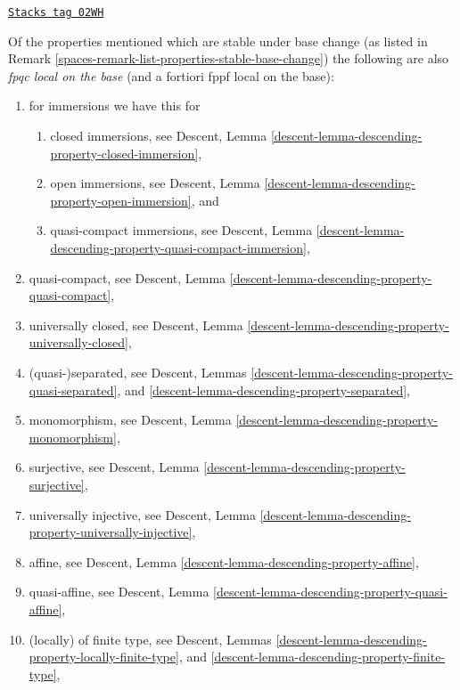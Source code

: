 \begin{remark}
\label{spaces-remark-list-properties-fpqc-local-base}
\href{https://stacks.math.columbia.edu/tag/02WH}{\texttt{Stacks tag 02WH}}

Of the properties mentioned which are stable under base change
(as listed in Remark \ref{spaces-remark-list-properties-stable-base-change})
the following are also {\it fpqc local on the base}
(and a fortiori fppf local on the base):
\begin{enumerate}
\item for immersions we have this for
\begin{enumerate}
\item closed immersions, see
Descent, Lemma \ref{descent-lemma-descending-property-closed-immersion},
\item open immersions, see
Descent, Lemma \ref{descent-lemma-descending-property-open-immersion}, and
\item quasi-compact immersions, see
Descent,
Lemma \ref{descent-lemma-descending-property-quasi-compact-immersion},
\end{enumerate}
\item quasi-compact, see
Descent, Lemma \ref{descent-lemma-descending-property-quasi-compact},
\item universally closed, see
Descent, Lemma
\ref{descent-lemma-descending-property-universally-closed},
\item (quasi-)separated, see
Descent, Lemmas
\ref{descent-lemma-descending-property-quasi-separated}, and
\ref{descent-lemma-descending-property-separated},
\item monomorphism, see
Descent, Lemma \ref{descent-lemma-descending-property-monomorphism},
\item surjective, see
Descent, Lemma \ref{descent-lemma-descending-property-surjective},
\item universally injective, see
Descent, Lemma \ref{descent-lemma-descending-property-universally-injective},
\item affine, see
Descent, Lemma \ref{descent-lemma-descending-property-affine},
\item quasi-affine, see
Descent, Lemma \ref{descent-lemma-descending-property-quasi-affine},
\item (locally) of finite type, see
Descent,
Lemmas \ref{descent-lemma-descending-property-locally-finite-type}, and
\ref{descent-lemma-descending-property-finite-type},

\end{enumerate}
\end{remark}
